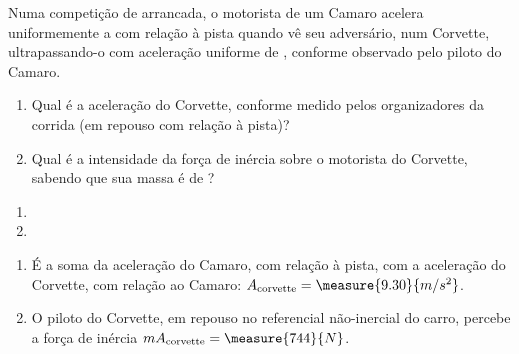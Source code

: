 \begin{question}
    Numa competição de arrancada, o motorista de um Camaro acelera uniformemente a  com relação à pista quando vê seu adversário, num Corvette, ultrapassando-o com aceleração uniforme de , conforme observado pelo piloto do Camaro.
    \begin{enumerate}
      \item Qual é a aceleração do Corvette, conforme medido pelos organizadores da corrida (em repouso com relação à pista)?
      \item Qual é a intensidade da força de inércia sobre o motorista do Corvette, sabendo que sua massa é de ?
    \end{enumerate}

    \begin{answer}
      \begin{enumerate}
        \item {}
        \item {}
      \end{enumerate}
    \end{answer}

    \begin{solution}
      \begin{enumerate}
        \item É a soma da aceleração do Camaro, com relação à pista, com a aceleração do Corvette, com relação ao Camaro: $A_{\text{corvette}} = \measure{9.30}{m/s^2}$.
        \item O piloto do Corvette, em repouso no referencial não-inercial do carro, percebe a força de inércia $mA_{\text{corvette}} = \measure{744}{N}$.
      \end{enumerate}
    \end{solution}
\end{question}